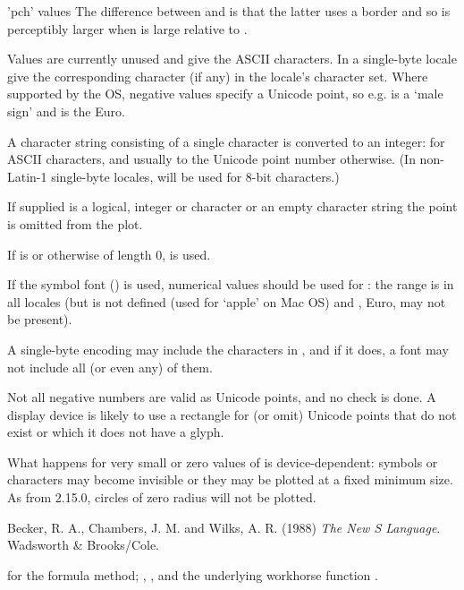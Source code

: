 \begin{Section}{'pch' values}
The difference between  and  is that the
latter uses a border and so is perceptibly larger when  is
large relative to .

Values  are currently unused and 
give the ASCII characters.  In a single-byte locale
 give the corresponding character (if any) in
the locale's character set.  Where supported by the OS, negative
values specify a Unicode point, so e.g. 
is a `male sign' and  is the Euro.

A character string consisting of a single character is converted to an
integer:  for ASCII characters, and usually to the
Unicode point number otherwise.  (In non-Latin-1 single-byte locales,
 will be used for 8-bit characters.)

If  supplied is a logical, integer or character
 or an empty character string the point is omitted from
the plot.

If  is  or otherwise of length 0,
 is used.

If the symbol font () is used, numerical
values should be used for : the range is
 in all locales (but  is not
defined (used for `apple' on Mac OS) and , Euro, may
not be present).
\end{Section}
%
\begin{Note}\relax
A single-byte encoding may include the characters in
, and if it does, a font may not include all (or
even any) of them.

Not all negative numbers are valid as Unicode points, and no check is
done.  A display device is likely to use a rectangle for (or omit)
Unicode points that do not exist or which it does not have a glyph.

What happens for very small or zero values of  is
device-dependent: symbols or characters may become invisible or
they may be plotted at a fixed minimum size.   As
from \R{} 2.15.0, circles of zero radius will not be plotted.
\end{Note}
%
\begin{References}\relax
Becker, R. A., Chambers, J. M. and Wilks, A. R. (1988)
\emph{The New S Language}.
Wadsworth \& Brooks/Cole.
\end{References}
%
\begin{SeeAlso}\relax
{} for the formula method;
, , and the underlying
workhorse function .
\end{SeeAlso}
